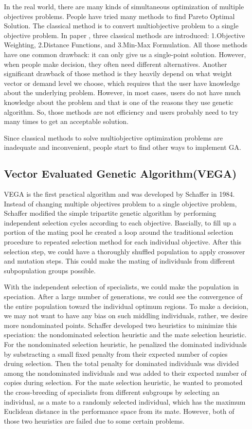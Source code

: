 In the real world, there are many kinds of simultaneous optimization of multiple objectives problems. People have tried many methods to find Pareto Optimal Solution. The classical method is to convert multiobjective problem to a single objective problem. In paper \cite{NSGA_1994}, three classical methods are introduced: 1.Objective Weighting, 2.Distance Functions, and 3.Min-Max Formulation. All those methods have one common drawback: it can only give us a single-point solution. However, when people make decision, they often need different alternatives. Another significant drawback of those method is they heavily depend on what weight vector or demand level we choose, which requires that the user have knowledge about the underlying problem. However, in most cases, users do not have much knowledge about the problem and that is one of the reasons they use genetic algorithm. So, those methods are not efficiency and users probably need to try many times to get an acceptable solution.

Since classical methods to solve multiobjective optimization problems are inadequate and inconvenient, people start to find other ways to implement GA.

\subsection{Vector Evaluated Genetic Algorithm(VEGA)}
VEGA is the first practical algorithm and was developed by Schaffer in 1984\cite{Schaffer_1984_Some}. Instead of changing multiple objectives problem to a single objective problem, Schaffer modified the simple tripartite genetic algorithm by performing independent selection cycles according to each objective\cite{Schaffer_1984_Some}. Bascially, to fill up a portion of the mating pool he created a loop around the traditional selection procedure to repeated selection method for each individual objective. After this selection step, we could have a thoroughly shuffled population to apply crossover and mutation steps. This could make the mating of individuals from different subpopulation groups possible.

With the independent selection of specialists, we could make the population in speciation. After a large number of generations, we could see the convergence of the entire population toward the individual optimum regions. To make a decision, we may not want to have any bias on such middling individuals, rather, we desire more nondominated points. Schaffer developed two heuristics to minimize this speciation: the nondominated selection heuristic and the mate selection heuristic. For the nondominated selection heuristic, he penalized the dominated individuals by substracting a small fixed penalty from their expected number of copies druing selection. Then the total penalty for dominated individuals was divided among the nondominated individuals and was added to their expected number of copies during selection. For the mate selection heuristic, he wanted to promoted the cross-breeding of specialists from different subgroups by selecting an individual, as a mate to a randomly selected individual, which has the maximum Euclidean distance in the performance space from its mate. However, both of those two heuristics are failed due to some certain problems.

